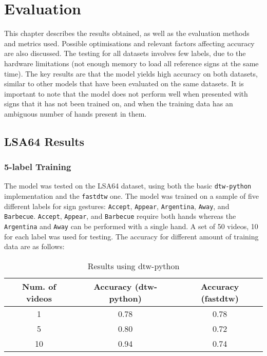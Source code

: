 \documentclass[final,rdr32.tex]{subfiles}
\begin{document}
\chapter{Evaluation}

This chapter describes the results obtained, as well as the evaluation methods and metrics used. Possible optimisations and relevant factors affecting accuracy are also discussed. The testing for all datasets involves few labels, due to the hardware limitations (not enough memory to load all reference signs at the same time). The key results are that the model yields high accuracy on both datasets, similar to other models that have been evaluated on the same datasets. It is important to note that the model does not perform well when presented with signs that it has not been trained on, and when the training data has an ambiguous number of hands present in them.

\section{LSA64 Results}

\subsection{5-label Training}

The model was tested on the LSA64 dataset, using both the basic \verb|dtw-python| implementation and the \verb|fastdtw| one. The model was trained on a sample of five different labels for sign gestures: \verb|Accept|, \verb|Appear|, \verb|Argentina|, \verb|Away|, and \verb|Barbecue|. \verb|Accept|, \verb|Appear|, and \verb|Barbecue| require both hands whereas the \verb|Argentina| and \verb|Away| can be performed with a single hand. A set of 50 videos, 10 for each label was used for testing. The accuracy for different amount of training data are as follows:

\begin{table}[!h]
    \begin{center}
        \begin{tabular}{ |c|c|c| }
            \hline
            Num. of videos & Accuracy (dtw-python) & Accuracy (fastdtw) \\
            \hline
            1              & 0.78                  & 0.78               \\
            5              & 0.80                  & 0.72               \\
            10             & 0.94                  & 0.74               \\
            \hline
        \end{tabular}
    \end{center}
    \caption{Results using dtw-python}
    \label{tab:accuracy}
\end{table}
\end{document}
